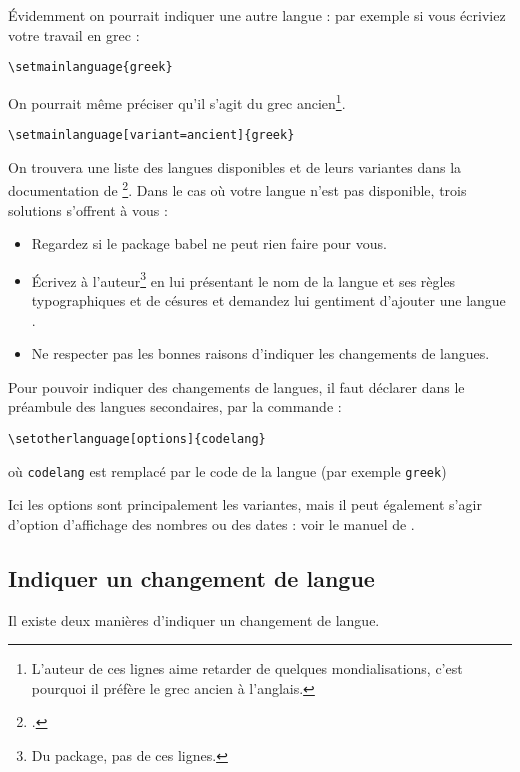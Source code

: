 Évidemment on pourrait indiquer une autre langue :  par exemple si vous écriviez votre travail en grec :

\begin{verbatim}
\setmainlanguage{greek}
\end{verbatim}

On pourrait même préciser qu'il s'agit du grec ancien\footnote{L'auteur de ces lignes aime retarder de quelques mondialisations, c'est pourquoi il préfère le grec ancien à l'anglais.}.

\begin{verbatim}
\setmainlanguage[variant=ancient]{greek}
\end{verbatim}


On trouvera une liste des langues disponibles et de leurs variantes dans la documentation de \footcite{polyglossia}. Dans le cas où votre langue n'est pas disponible, trois solutions s'offrent à vous :
\begin{itemize}
\item Regardez si le package babel ne peut rien faire pour vous. 
\item Écrivez à l'auteur\footnote{Du package, pas de ces lignes.} en lui présentant le nom de la langue et ses règles typographiques et de césures et demandez lui gentiment d'ajouter une langue .
\item Ne respecter pas les bonnes raisons d'indiquer les changements de langues.
\end{itemize}

Pour pouvoir indiquer des changements de langues, il faut déclarer dans le préambule des langues secondaires, par la commande :

\begin{verbatim}
\setotherlanguage[options]{codelang}
\end{verbatim}

où \verb|codelang| est remplacé par le code de la langue (par exemple \verb|greek|)

Ici les options sont principalement les variantes, mais il peut également s'agir d'option d'affichage des nombres ou des dates : voir le manuel de .

\subsection{Indiquer un changement de langue}

Il existe deux manières d'indiquer un changement de langue.

